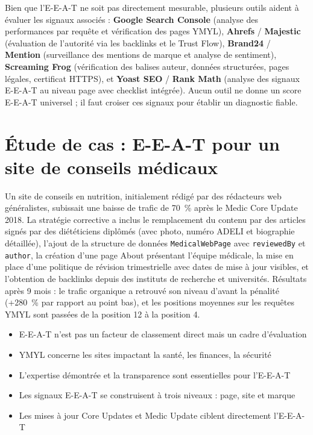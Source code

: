 \documentclass[12pt,a4paper,twoside]{report}
\newcommand{\keyword}[1]{\textbf{\textcolor{googleblue}{#1}}}
\begin{document}
Bien que l'E-E-A-T ne soit pas directement mesurable, plusieurs outils aident à évaluer les signaux associés : \keyword{Google Search Console} (analyse des performances par requête et vérification des pages YMYL), \keyword{Ahrefs} / \keyword{Majestic} (évaluation de l'autorité via les backlinks et le Trust Flow), \keyword{Brand24} / \keyword{Mention} (surveillance des mentions de marque et analyse de sentiment), \keyword{Screaming Frog} (vérification des balises auteur, données structurées, pages légales, certificat HTTPS), et \keyword{Yoast SEO} / \keyword{Rank Math} (analyse des signaux E-E-A-T au niveau page avec checklist intégrée). Aucun outil ne donne un score E-E-A-T universel ; il faut croiser ces signaux pour établir un diagnostic fiable.

\section{Étude de cas : E-E-A-T pour un site de conseils médicaux}

Un site de conseils en nutrition, initialement rédigé par des rédacteurs web généralistes, subissait une baisse de trafic de 70~\% après le Medic Core Update 2018. La stratégie corrective a inclus le remplacement du contenu par des articles signés par des diététiciens diplômés (avec photo, numéro ADELI et biographie détaillée), l'ajout de la structure de données \texttt{MedicalWebPage} avec \texttt{reviewedBy} et \texttt{author}, la création d'une page About présentant l'équipe médicale, la mise en place d'une politique de révision trimestrielle avec dates de mise à jour visibles, et l'obtention de backlinks depuis des instituts de recherche et universités. Résultats après 9 mois : le trafic organique a retrouvé son niveau d'avant la pénalité (+280~\% par rapport au point bas), et les positions moyennes sur les requêtes YMYL sont passées de la position 12 à la position 4.

\begin{takeaways}
\begin{itemize}
    \item E-E-A-T n'est pas un facteur de classement direct mais un cadre d'évaluation
    \item YMYL concerne les sites impactant la santé, les finances, la sécurité
    \item L'expertise démontrée et la transparence sont essentielles pour l'E-E-A-T
    \item Les signaux E-E-A-T se construisent à trois niveaux : page, site et marque
    \item Les mises à jour Core Updates et Medic Update ciblent directement l'E-E-A-T
\end{itemize}
\end{takeaways}
\end{document}

